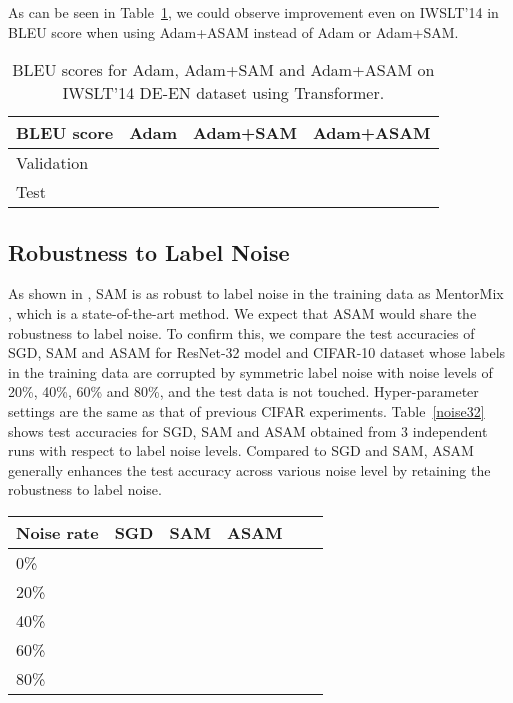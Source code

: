 \documentclass{article}
\begin{document}
As can be seen in Table~\ref{iwslt}, we could observe improvement even on IWSLT'14 in BLEU score when using Adam+ASAM instead of Adam or Adam+SAM.


\begin{table}[h]
\setlength\tabcolsep{4.5pt}
\caption{BLEU scores for Adam, Adam+SAM and Adam+ASAM on IWSLT'14 DE-EN dataset using Transformer. \label{iwslt}}
\begin{center}
\begin{small}
\begin{tabular}{lccc}
\toprule
BLEU score & Adam & Adam+SAM & Adam+ASAM\\
\midrule
Validation &  &  & \\
Test &  &  & \\
\bottomrule
\end{tabular}
\end{small}
\end{center}
\end{table}






\subsection{Robustness to Label Noise} \label{robust}

As shown in \citet{foret2021sharpnessaware}, SAM is as robust to label noise in the training data as MentorMix \citep{jiang2020beyond}, which is a state-of-the-art method.  
We expect that ASAM would share the robustness to label noise. To confirm this, we compare the test accuracies of SGD, SAM and ASAM for ResNet-32 model and CIFAR-10 dataset whose labels in the training data are corrupted by symmetric label noise \citep{van2015learning} with noise levels of 20\%, 40\%, 60\% and 80\%, and the test data is not touched. Hyper-parameter settings are the same as that of previous CIFAR experiments.
Table~\ref{noise32} shows test accuracies for SGD, SAM and ASAM obtained from 3 independent runs with respect to label noise levels. Compared to SGD and SAM, ASAM generally enhances the test accuracy across various noise level by retaining the robustness to label noise.

\begintable
\caption{Maximum test accuracies of ResNet-32 models trained on CIFAR-10 with label noise.\label{noise32}}
\begin{center}
\begin{small}
\begin{tabular}{lccccr}
\toprule
Noise rate & SGD & SAM & ASAM \\
\midrule
0\% &  &  &  \\
20\% &  &  &  \\
40\% &  &  &  \\
60\% &  &  &  \\
80\% &  &  &  \\
\bottomrule
\end{tabular}
\end{small}
\end{center}
\jmkendtable
\end{document}
